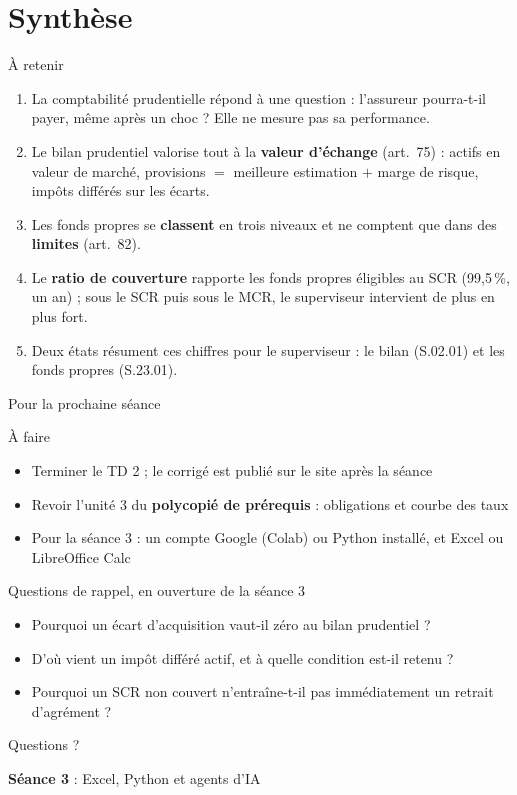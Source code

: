 \documentclass[10pt,aspectratio=169]{beamer}
\begin{document}
\section{Synthèse}

\begin{frame}{À retenir}
\begin{enumerate}
  \item La comptabilité prudentielle répond à une question : l'assureur pourra-t-il payer, même
        après un choc ? Elle ne mesure pas sa performance.
  \item Le bilan prudentiel valorise tout à la \textbf{valeur d'échange} (art.~75) : actifs en valeur
        de marché, provisions $=$ meilleure estimation $+$ marge de risque, impôts différés sur les écarts.
  \item Les fonds propres se \textbf{classent} en trois niveaux et ne comptent que dans des
        \textbf{limites} (art.~82).
  \item Le \textbf{ratio de couverture} rapporte les fonds propres éligibles au SCR (99,5\,\%, un an) ;
        sous le SCR puis sous le MCR, le superviseur intervient de plus en plus fort.
  \item Deux états résument ces chiffres pour le superviseur : le bilan (S.02.01) et les fonds propres (S.23.01).
\end{enumerate}
\end{frame}

\begin{frame}{Pour la prochaine séance}
\begin{block}{À faire}
\begin{itemize}
  \item Terminer le TD 2 ; le corrigé est publié sur le site après la séance
  \item Revoir l'unité 3 du \textbf{polycopié de prérequis} : obligations et courbe des taux
  \item Pour la séance 3 : un compte Google (Colab) ou Python installé, et Excel ou LibreOffice Calc
\end{itemize}
\end{block}
\begin{block}{Questions de rappel, en ouverture de la séance 3}
\begin{itemize}
  \item Pourquoi un écart d'acquisition vaut-il zéro au bilan prudentiel ?
  \item D'où vient un impôt différé actif, et à quelle condition est-il retenu ?
  \item Pourquoi un SCR non couvert n'entraîne-t-il pas immédiatement un retrait d'agrément ?
\end{itemize}
\end{block}
\end{frame}

\begin{frame}[c]
\centering
\Huge Questions ?

\vspace{1cm}
\Large
\textbf{Séance 3} : Excel, Python et agents d'IA
\end{frame}
\end{document}
